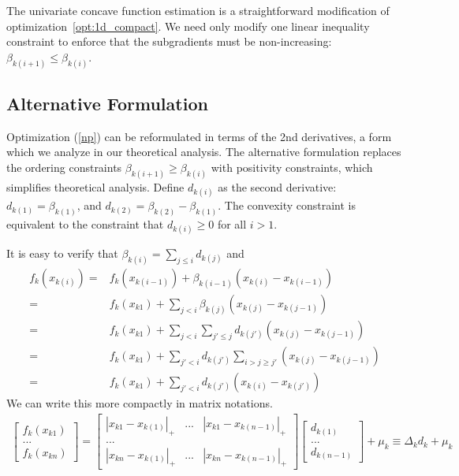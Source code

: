 The univariate concave function estimation is a straightforward modification of optimization~\ref{opt:1d_compact}. We need only modify one linear inequality constraint to enforce that the subgradients must be non-increasing: $\beta_{k(i+1)} \leq \beta_{k(i)}$.


\subsection{Alternative Formulation}
Optimization (\ref{np}) can be reformulated in terms of the 2nd derivatives, a form which we analyze in our theoretical analysis. The alternative formulation replaces the ordering
constraints $\beta_{k(i+1)} \geq \beta_{k(i)}$ with positivity
constraints, which simplifies theoretical analysis.
Define $d_{k(i)}$ as the second derivative:
$d_{k(1)} = \beta_{k(1)}$, and $d_{k(2)} =
\beta_{k(2)} - \beta_{k(1)}$. The convexity constraint is
equivalent to the constraint that $d_{k(i)} \geq 0$ for all $i >
1$.

It is easy to verify that $\beta_{k(i)} = \sum_{j \leq i} d_{k(j)}$ and 
\begin{align*}
f_k(x_{k(i)}) = & f_k(x_{k(i-1)}) + \beta_{k(i-1)}(x_{k(i)} - x_{k(i-1)}) \\
 =& f_k(x_{k1}) + \sum_{j < i} \beta_{k(j)} (x_{k(j)} - x_{k(j-1)}) \\
 =& f_k(x_{k1}) + \sum_{j < i} \sum_{j' \leq j} d_{k(j')} (x_{k(j)} - x_{k(j-1)})\\
 =& f_k(x_{k1}) + \sum_{j' < i} d_{k(j')} \sum_{i > j \geq j'} (x_{k(j)} - x_{k(j-1)}) \\
 =& f_k(x_{k1}) + \sum_{j' < i} d_{k(j')} (x_{k(i)} - x_{k(j')})
\end{align*}
We can write this more compactly in matrix notations.
\begin{equation*}
\begin{split}
\left[ \begin{array}{c}
f_k(x_{k1}) \\
... \\
f_k(x_{kn}) 
\end{array} \right] =
\left[ \begin{array}{ccc}
    |x_{k1} - x_{k(1)}|_+ & ... & |x_{k1} - x_{k(n-1)}|_+ \\
    ... & & \\
    |x_{kn} - x_{k(1)}|_+ & ... & |x_{kn} - x_{k(n-1)}|_+ 
\end{array} \right]
\left[ \begin{array}{c}
    d_{k(1)} \\
    ... \\
    d_{k(n-1)}
\end{array} \right] 
+ \mu_k \equiv \Delta_k d_k + \mu_k
\end{split}
\end{equation*}


